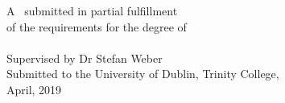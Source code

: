 \begin{titlepage}
A \typeofthesis\ submitted in partial fulfillment\\of the requirements for the degree of\\
\degree\\[1cm]


Supervised by Dr Stefan Weber\\[1cm]


Submitted to the University of Dublin, Trinity College,\\
April, 2019

\vfill %

\end{titlepage}
